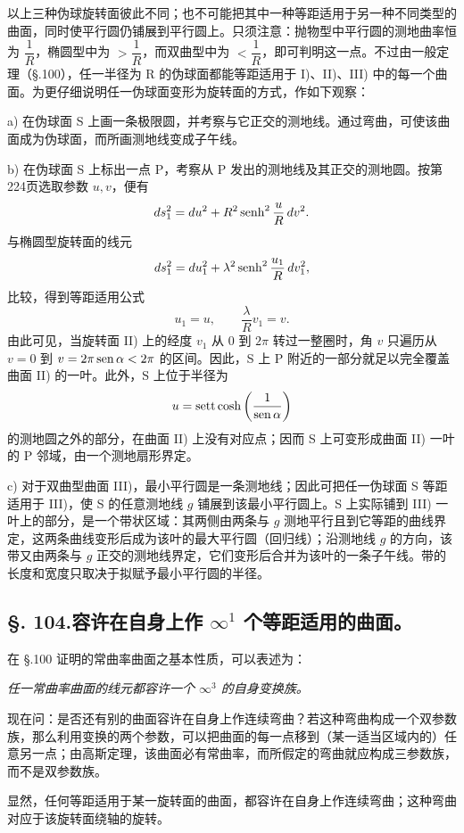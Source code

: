 以上三种伪球旋转面彼此不同；也不可能把其中一种等距适用于另一种不同类型的曲面，同时使平行圆仍铺展到平行圆上。只须注意：抛物型中平行圆的测地曲率恒为 \(\dfrac1R\)，椭圆型中为 \(>\dfrac1R\)，而双曲型中为 \(<\dfrac1R\)，即可判明这一点。不过由一般定理（\S.100），任一半径为 R 的伪球面都能等距适用于 I)、II)、III) 中的每一个曲面。为更仔细说明任一伪球面变形为旋转面的方式，作如下观察：

a) 在伪球面 S 上画一条极限圆，并考察与它正交的测地线。通过弯曲，可使该曲面成为伪球面，而所画测地线变成子午线。

b) 在伪球面 S 上标出一点 P，考察从 P 发出的测地线及其正交的测地圆。按第224页选取参数 \(u,v\)，便有
\[
 ds_1^2=du^2+R^2\operatorname{senh}^2\frac{u}{R}\,dv^2.
\]
与椭圆型旋转面的线元
\[
 ds_1^2=du_1^2+\lambda^2\operatorname{senh}^2\frac{u_1}{R}\,dv_1^2,
\]
比较，得到等距适用公式
\[
 u_1=u,
 \qquad
 \frac{\lambda}{R}v_1=v.
\]
由此可见，当旋转面 II) 上的经度 \(v_1\) 从 0 到 \(2\pi\) 转过一整圈时，角 \(v\) 只遍历从 \(v=0\) 到 \(v=2\pi\operatorname{sen}\alpha<2\pi\) 的区间。因此，S 上 P 附近的一部分就足以完全覆盖曲面 II) 的一叶。此外，S 上位于半径为
\[
 u=\operatorname{sett}\cosh\left(\frac1{\operatorname{sen}\alpha}\right)
\]
的测地圆之外的部分，在曲面 II) 上没有对应点；因而 S 上可变形成曲面 II) 一叶的 P 邻域，由一个测地扇形界定。

c) 对于双曲型曲面 III)，最小平行圆是一条测地线；因此可把任一伪球面 S 等距适用于 III)，使 S 的任意测地线 \(g\) 铺展到该最小平行圆上。S 上实际铺到 III) 一叶上的部分，是一个带状区域：其两侧由两条与 \(g\) 测地平行且到它等距的曲线界定，这两条曲线变形后成为该叶的最大平行圆（回归线）；沿测地线 \(g\) 的方向，该带又由两条与 \(g\) 正交的测地线界定，它们变形后合并为该叶的一条子午线。带的长度和宽度只取决于拟赋予最小平行圆的半径。

\subsection*{\S. 104.\quad 容许在自身上作 \(\infty^1\) 个等距适用的曲面。}

在 \S.100 证明的常曲率曲面之基本性质，可以表述为：

\emph{任一常曲率曲面的线元都容许一个 \(\infty^3\) 的自身变换族。}

现在问：是否还有别的曲面容许在自身上作连续弯曲？若这种弯曲构成一个双参数族，那么利用变换的两个参数，可以把曲面的每一点移到（某一适当区域内的）任意另一点；由高斯定理，该曲面必有常曲率，而所假定的弯曲就应构成三参数族，而不是双参数族。

显然，任何等距适用于某一旋转面的曲面，都容许在自身上作连续弯曲；这种弯曲对应于该旋转面绕轴的旋转。


